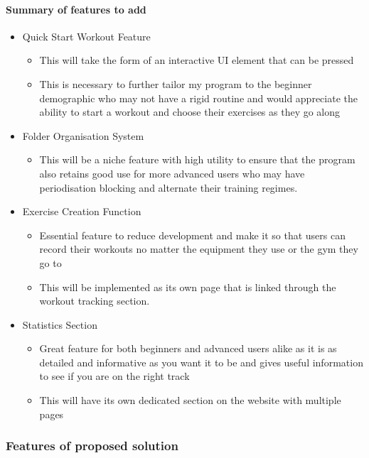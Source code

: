\documentclass{article}
\begin{document}
\paragraph{Summary of features to add}
\begin{itemize}
  \item Quick Start Workout Feature
  \begin{itemize}
    \item This will take the form of an interactive UI element that can be pressed
    \item This is necessary to further tailor my program to the beginner demographic who may not have a rigid routine and would appreciate the ability to start a workout and choose their exercises as they go along
  \end{itemize}
  \item Folder Organisation System
  \begin{itemize}
    \item This will be a niche feature with high utility to ensure that the program also retains good use for more advanced users who may have periodisation blocking and alternate their training regimes.
  \end{itemize} 
  \item Exercise Creation Function
  \begin{itemize}
    \item Essential feature to reduce development and make it so that users can record their workouts no matter the equipment they use or the gym they go to
    \item This will be implemented as its own page that is linked through the workout tracking section.
  \end{itemize}
  \item Statistics Section
  \begin{itemize}
    \item Great feature for both beginners and advanced users alike as it is as detailed and informative as you want it to be and gives useful information to see if you are on the right track
    \item This will have its own dedicated section on the website with multiple pages 
  \end{itemize}
\end{itemize}

\subsubsection{Features of proposed solution}
\end{document}
